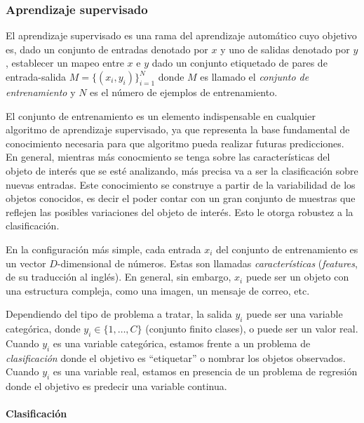 	
	\subsubsection{Aprendizaje supervisado}
	
	El aprendizaje supervisado es una rama del aprendizaje automático cuyo objetivo es, dado un conjunto de entradas denotado por $x$ y uno de salidas denotado por $y$, establecer un mapeo entre $x$ e $y$ dado un conjunto etiquetado de pares de entrada-salida $M=\{(x_i,y_i)\}^{N}_{i=1}$ donde $M$ es llamado el \textit{conjunto de entrenamiento} y $N$ es el número de ejemplos de entrenamiento.
	
	El conjunto de entrenamiento es un elemento indispensable en cualquier algoritmo de aprendizaje supervisado, ya que representa la base fundamental de conocimiento necesaria para que algoritmo pueda realizar futuras predicciones. En general, mientras más conocmiento se tenga sobre las características del objeto de interés que se esté analizando, más precisa va a ser la clasificación sobre nuevas entradas. Este conocimiento se construye a partir de la variabilidad de los objetos conocidos, es decir el poder contar con un gran conjunto de muestras que reflejen las posibles variaciones del objeto de interés. Esto le otorga robustez a la clasificación.
	
	En la configuración más simple, cada entrada $x_i$ del conjunto de entrenamiento es un vector $D$-dimensional de números. Estas son llamadas \textit{características} (\textit{features}, de su traducción al inglés). En general, sin embargo, $x_i$ puede ser un objeto con una estructura compleja, como una imagen, un mensaje de correo, etc.
	
	Dependiendo del tipo de problema a tratar, la salida $y_i$ puede ser una variable categórica, donde $y_i \in \{1,\dots,C\}$ (conjunto finito clases), o puede ser un valor real. Cuando $y_i$ es una variable categórica, estamos frente a un problema de \textit{clasificación} donde el objetivo es ``etiquetar'' o nombrar los objetos observados. Cuando $y_i$ es una variable real, estamos en presencia de un problema de regresión donde el objetivo es predecir una variable continua.
	
	
	\paragraph{Clasificación}  ~\\
	
